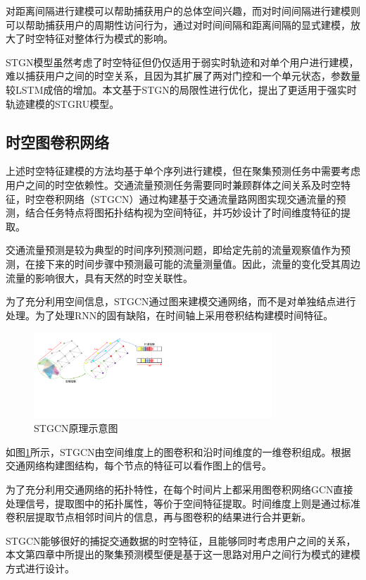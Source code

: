 \documentclass[master]{thesis-uestc}
\begin{document}
对距离间隔进行建模可以帮助捕获用户的总体空间兴趣，而对时间间隔进行建模则可以帮助捕获用户的周期性访问行为，通过对时间间隔和距离间隔的显式建模，放大了时空特征对整体行为模式的影响。

STGN模型虽然考虑了时空特征但仍仅适用于弱实时轨迹和对单个用户进行建模，难以捕获用户之间的时空关系，且因为其扩展了两对门控和一个单元状态，参数量较LSTM成倍的增加。本文基于STGN的局限性进行优化，提出了更适用于强实时轨迹建模的STGRU模型。

\subsection{时空图卷积网络}
上述时空特征建模的方法均基于单个序列进行建模，但在聚集预测任务中需要考虑用户之间的时空依赖性。交通流量预测任务需要同时兼顾群体之间关系及时空特征，时空卷积网络（STGCN）通过构建基于交通流量路网图实现交通流量的预测，结合任务特点将图拓扑结构视为空间特征，并巧妙设计了时间维度特征的提取。

交通流量预测是较为典型的时间序列预测问题，即给定先前的流量观察值作为预测，在接下来的时间步骤中预测最可能的流量测量值。因此，流量的变化受其周边流量的影响很大，具有天然的时空关联性。

为了充分利用空间信息，STGCN通过图来建模交通网络，而不是对单独结点进行处理。为了处理RNN的固有缺陷，在时间轴上采用卷积结构建模时间特征。

\begin{figure}[!ht]
\centering 
\includegraphics[width=0.8\textwidth]{./pic/astgcn.pdf}
\caption{STGCN原理示意图}
\label{Figure.2.12}
\end{figure}
如图\ref{Figure.2.12}所示，STGCN由空间维度上的图卷积和沿时间维度的一维卷积组成。根据交通网络构建图结构，每个节点的特征可以看作图上的信号。

为了充分利用交通网络的拓扑特性，在每个时间片上都采用图卷积网络GCN直接处理信号，提取图中的拓扑属性，等价于空间特征提取。时间维度上则是通过标准卷积层提取节点相邻时间片的信息，再与图卷积的结果进行合并更新。

STGCN能够很好的捕捉交通数据的时空特征，且能够同时考虑用户之间的关系，本文第四章中所提出的聚集预测模型便是基于这一思路对用户之间行为模式的建模方式进行设计。
\end{document}
